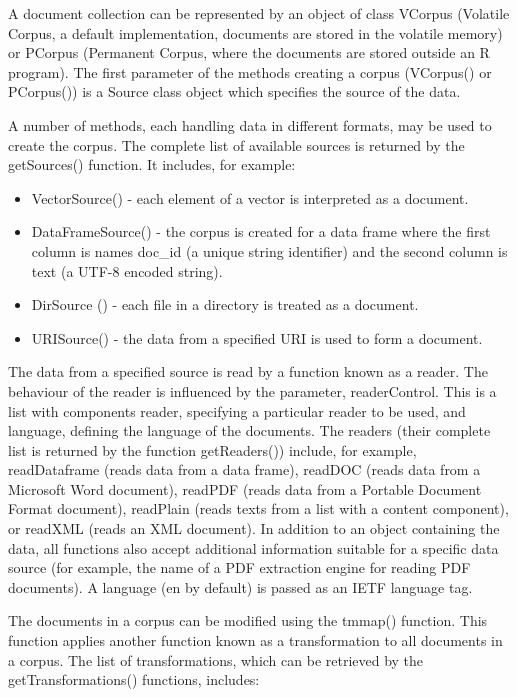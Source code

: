 \documentclass[11pt,openany,executivepaper]{book}
\begin{document}
A document collection can be represented by an object of class VCorpus (Volatile Corpus, a default implementation, documents are stored in the volatile memory) or PCorpus (Permanent Corpus, where the documents are stored outside an R program). The first parameter of the methods creating a corpus (VCorpus() or PCorpus()) is a Source class object which specifies the source of the data.

A number of methods, each handling data in different formats, may be used to create the corpus. The complete list of available sources is returned by the getSources() function. It includes, for example:

\begin{itemize}
  \item VectorSource() - each element of a vector is interpreted as a document.
  \item DataFrameSource() - the corpus is created for a data frame where the first column is names doc\_id (a unique string identifier) and the second column is text (a UTF-8 encoded string).
  \item DirSource () - each file in a directory is treated as a document.
  \item URISource() - the data from a specified URI is used to form a document.
\end{itemize}

The data from a specified source is read by a function known as a reader. The behaviour of the reader is influenced by the parameter, readerControl. This is a list with components reader, specifying a particular reader to be used, and language, defining the language of the documents. The readers (their complete list is returned by the function getReaders()) include, for example, readDataframe (reads data from a data frame), readDOC (reads data from a Microsoft Word document), readPDF (reads data from a Portable Document Format document), readPlain (reads texts from a list with a content component), or readXML (reads an XML document). In addition to an object containing the data, all functions also accept additional information suitable for a specific data source (for example, the name of a PDF extraction engine for reading PDF documents). A language (en by default) is passed as an IETF language tag.

The documents in a corpus can be modified using the tmmap() function. This function applies another function known as a transformation to all documents in a corpus. The list of transformations, which can be retrieved by the getTransformations() functions, includes:
\end{document}

